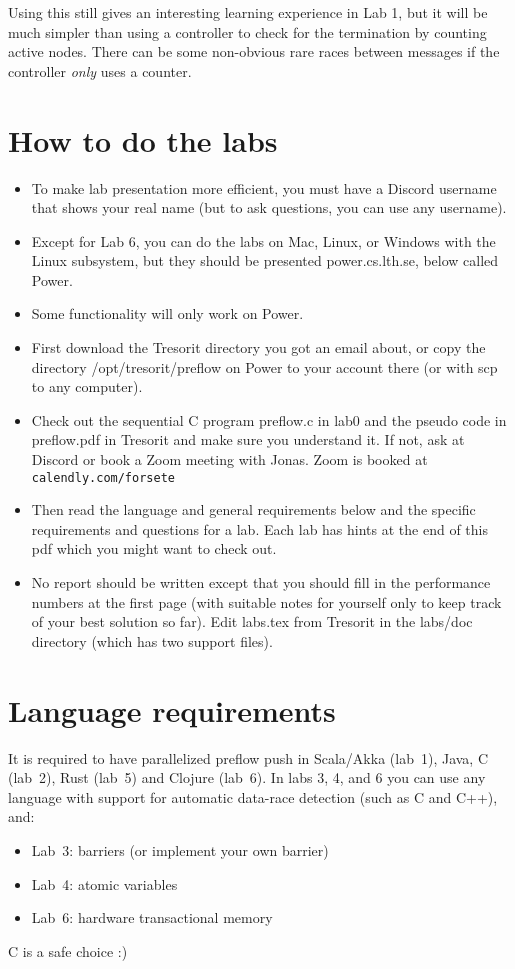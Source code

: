 \documentclass{forsete}
\begin{document}
Using this still gives an interesting learning experience in Lab 1, but it will be much simpler than using a
controller to check for the termination by counting active nodes. There can be some non-obvious rare races between messages if 
the controller {\em only} uses a counter.

\section{How to do the labs}
\begin{itemize}
\item To make lab presentation more efficient, you must have a Discord username that shows your real name (but to ask questions, you can use any username).
\item Except for Lab 6, you can do the labs on Mac, Linux, or Windows with the Linux subsystem, but they
should be presented power.cs.lth.se, below called Power.
\item Some functionality will only work on Power.
\item First download the Tresorit directory you got an email about, or copy the directory /opt/tresorit/preflow on Power to your account 
there (or with scp to any computer).
\item Check out the sequential C program preflow.c in lab0 and the pseudo code in preflow.pdf in Tresorit and
make sure you understand it. If not, ask at Discord or book a Zoom meeting with Jonas. Zoom is booked 
at \verb!calendly.com/forsete!
\item Then read the language and general requirements below and the specific requirements and questions for a lab. Each
lab has hints at the end of this pdf which you might want to check out.
\item No report should be written except that you should fill in the performance numbers at the first page (with suitable notes for yourself 
only to keep track of your best solution so far). Edit labs.tex from Tresorit in the labs/doc directory (which has two support files).
\end{itemize}
\section{\label{lang.sec}Language requirements}
It is required to have parallelized preflow push in Scala/Akka (lab~1), Java, C (lab~2), Rust (lab~5) 
and Clojure (lab~6). In labs 3, 4, and 6 you can use any language with support for 
automatic data-race detection (such as C and C++), and:
\begin{itemize}
\item Lab~3: barriers (or implement your own barrier)
\item Lab~4: atomic variables 
\item Lab~6: hardware transactional memory
\end{itemize}
C is a safe choice :)
\end{document}
